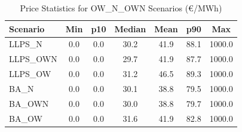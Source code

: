 \begin{table}[htbp]
\centering
\caption{Price Statistics for OW\_N\_OWN Scenarios (€/MWh)}
\label{tab:price_stats_ow_n_own}
\begin{tabular}{lcccccc}
\hline
\textbf{Scenario} & \textbf{Min} & \textbf{p10} & \textbf{Median} & \textbf{Mean} & \textbf{p90} & \textbf{Max} \\
\hline
LLPS_N & 0.0 & 0.0 & 30.2 & 41.9 & 88.1 & 1000.0 \\
LLPS_OWN & 0.0 & 0.0 & 29.7 & 41.9 & 87.7 & 1000.0 \\
LLPS_OW & 0.0 & 0.0 & 31.2 & 46.5 & 89.3 & 1000.0 \\
BA_N & 0.0 & 0.0 & 30.1 & 38.8 & 79.5 & 1000.0 \\
BA_OWN & 0.0 & 0.0 & 30.0 & 38.8 & 79.7 & 1000.0 \\
BA_OW & 0.0 & 0.0 & 31.6 & 41.9 & 82.8 & 1000.0 \\
\hline
\end{tabular}
\end{table}